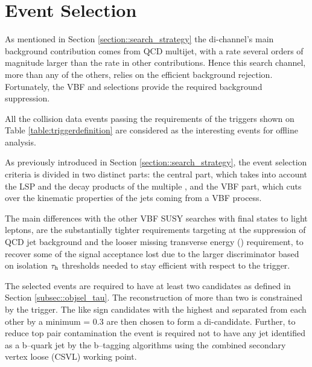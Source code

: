 

\section{Event Selection}
\label{sec:eventselection}



As mentioned in Section \ref{section::search_strategy} the di-\hadtau channel's main background contribution comes from QCD multijet, with a rate several orders of magnitude larger than the rate in other contributions. Hence this search channel, more than any of the others, relies on the efficient background rejection. Fortunately, the VBF and \met selections provide the required background suppression.

All the collision data events passing the requirements of the triggers shown on Table \ref{table:triggerdefinition} are considered as the interesting events for offline analysis. 

As previously introduced in Section \ref{section::search_strategy}, the event selection criteria is divided in two distinct parts: the central part, which takes into account the LSP and the decay products of the multiple \hadtau, and the VBF part, which cuts over the kinematic properties of the jets coming from a VBF process. 

The main differences with the other VBF SUSY searches with final states to light leptons, are the substantially tighter \hadtau requirements targeting at the suppression of QCD jet background and the looser missing transverse energy (\met) requirement, to recover some of the signal acceptance lost due to the larger discriminator based on isolation $\tau_{\text{h}}$ \pt thresholds needed to stay efficient with respect to the trigger. 

The selected events are required to have at least two \hadtau candidates as defined in Section \ref{subsec::objsel_tau}. The reconstruction of more than two \hadtau is constrained by the trigger. The like sign \hadtau candidates with the highest \pt and separated from each other by a minimum \deltar = 0.3 are then chosen to form a di-\hadtau candidate. 
Further, to reduce top pair contamination the event is required not to have any jet identified as a b--quark jet by the b--tagging algorithms using the {\textit combined secondary vertex loose} (CSVL) working point. 

